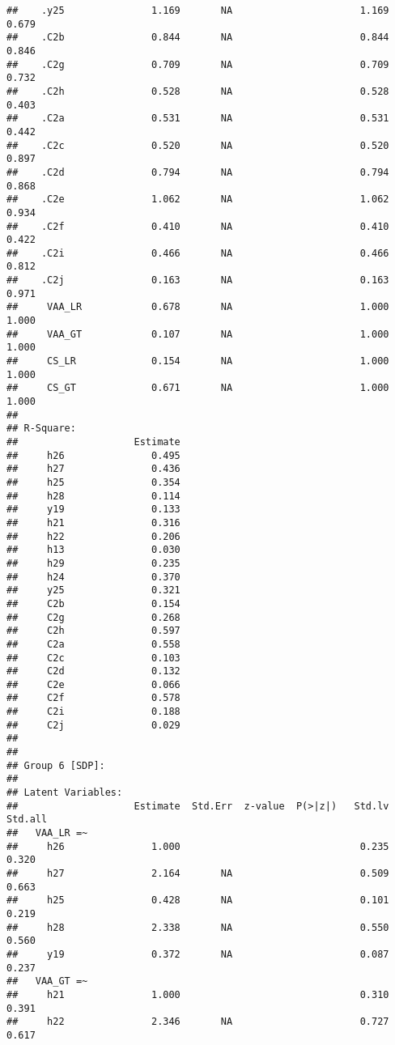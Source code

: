\documentclass[
]{article}
\begin{document}
\begin{verbatim}
##    .y25               1.169       NA                      1.169    0.679
##    .C2b               0.844       NA                      0.844    0.846
##    .C2g               0.709       NA                      0.709    0.732
##    .C2h               0.528       NA                      0.528    0.403
##    .C2a               0.531       NA                      0.531    0.442
##    .C2c               0.520       NA                      0.520    0.897
##    .C2d               0.794       NA                      0.794    0.868
##    .C2e               1.062       NA                      1.062    0.934
##    .C2f               0.410       NA                      0.410    0.422
##    .C2i               0.466       NA                      0.466    0.812
##    .C2j               0.163       NA                      0.163    0.971
##     VAA_LR            0.678       NA                      1.000    1.000
##     VAA_GT            0.107       NA                      1.000    1.000
##     CS_LR             0.154       NA                      1.000    1.000
##     CS_GT             0.671       NA                      1.000    1.000
## 
## R-Square:
##                    Estimate
##     h26               0.495
##     h27               0.436
##     h25               0.354
##     h28               0.114
##     y19               0.133
##     h21               0.316
##     h22               0.206
##     h13               0.030
##     h29               0.235
##     h24               0.370
##     y25               0.321
##     C2b               0.154
##     C2g               0.268
##     C2h               0.597
##     C2a               0.558
##     C2c               0.103
##     C2d               0.132
##     C2e               0.066
##     C2f               0.578
##     C2i               0.188
##     C2j               0.029
## 
## 
## Group 6 [SDP]:
## 
## Latent Variables:
##                    Estimate  Std.Err  z-value  P(>|z|)   Std.lv  Std.all
##   VAA_LR =~                                                             
##     h26               1.000                               0.235    0.320
##     h27               2.164       NA                      0.509    0.663
##     h25               0.428       NA                      0.101    0.219
##     h28               2.338       NA                      0.550    0.560
##     y19               0.372       NA                      0.087    0.237
##   VAA_GT =~                                                             
##     h21               1.000                               0.310    0.391
##     h22               2.346       NA                      0.727    0.617

\end{verbatim}
\end{document}
